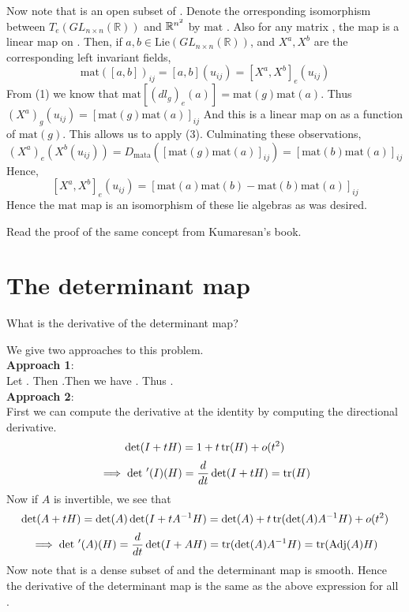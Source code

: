 \documentclass{article}
\newcommand*{\glrg}[1]{GL_{#1 \times #1}(\mathbb{R})}
\newcommand*{\mr}[1]{M_{#1 \times #1}(\mathbb{R})}
\begin{document}
Now note that \mm{\glrg{n}} is an open subset of \mm{\mr{n}\cong \RR^{n^2}}. Denote the orresponding isomorphism between $T_e(\glrg{n})$ and $\mathbb R^{n^2}$ by $\text{mat}$ . Also for any matrix , the map  is a linear map on \mm{\mr{n}}. 
Then, if $a,b\in \text{Lie}(\glrg{n})$, and $X^a,X^b$ are the corresponding left invariant fields, $$\text{mat}([a,b])_{ij} = [a,b](u_{ij}) = [X^a,X^b]_e(u_{ij})$$
From (1) we know that $\text{mat}[(dl_g)_e(a)] = \text{mat}(g)\text{mat}(a)$. Thus $(X^a)_g(u_{ij}) = [\text{mat}(g)\text{mat}(a)]_{ij}$ And this is a linear map on  as a function of $\text{mat}(g)$. This allows us to apply (3). Culminating these observations,
$$(X^a)_e(X^b(u_{ij})) = D_{\text{mat{a}}}([\text{mat}(g)\text{mat}(a)]_{ij}) = [\text{mat}(b)\text{mat}(a)]_{ij}$$
Hence, $$[X^a,X^b]_e(u_{ij}) = [\text{mat}(a)\text{mat}(b) - \text{mat}(b)\text{mat}(a)]_{ij}$$
Hence the $\text{mat}$ map is an isomorphism of these lie algebras as was desired.

\begin{exercise*}
    Read the proof of the same concept from Kumaresan's book.
\end{exercise*}

\section{The determinant map}

\begin{question*}
    What is the derivative of the determinant map?
\end{question*}

We give two approaches to this problem.\\
\textbf{Approach 1}:\\
Let . Then .Then we have . 
Thus . 
\\
\textbf{Approach 2}:\\
First we can compute the derivative at the identity by computing the directional derivative. 
$$\det(I+tH) = 1 + t\operatorname{tr} (H)+o(t^2)$$
$$\implies \det\,'(I)(H) =  \frac{d}{dt}\det(I+tH) = \operatorname{tr}(H)$$
Now if $A$ is invertible, we see that $$\det(A+tH) = \det(A)\det(I+tA^{-1}H) = \det(A) + t\operatorname{tr}(\det(A)A^{-1}H) + o(t^2)$$
$$\implies \det\,'(A)(H) =  \frac{d}{dt}\det(I+AH) = \operatorname{tr}(\det(A)A^{-1}H) = \operatorname{tr}(\operatorname{Adj}(A)H)$$
Now note that \mm{\glrg{n}} is a dense subset of \mm{\mr{n}} and the determinant map is smooth. Hence the derivative of the determinant map is the same as the above expression for all \mm{A\in \mr{n}}.
\end{document}
